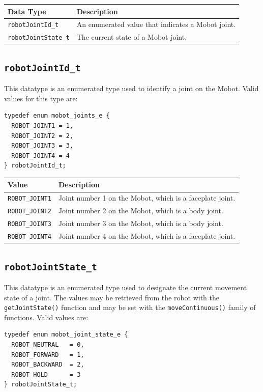 \documentclass{article}
\begin{document}
\begin{tabular}{p{3.5cm}p{10cm}} \hline 
Data Type& Description \\
\hline 
\texttt{robotJointId\_t} & An enumerated value that indicates a Mobot joint. \\
\texttt{robotJointState\_t} & The current state of a Mobot joint. \\
\hline
\end{tabular}

\subsection{\label{sec:robotJointId_t}\texttt{robotJointId\_t}}
This datatype is an enumerated type used to identify a joint on the Mobot. Valid
values for this type are:
\begin{verbatim}
typedef enum mobot_joints_e {
  ROBOT_JOINT1 = 1,
  ROBOT_JOINT2 = 2,
  ROBOT_JOINT3 = 3,
  ROBOT_JOINT4 = 4
} robotJointId_t;
\end{verbatim}

\begin{tabular}{p{3cm}p{10cm}} \hline 
Value & Description \\
\hline 
\texttt{ROBOT\_JOINT1} & Joint number 1 on the Mobot, which is a faceplate joint. \\
\texttt{ROBOT\_JOINT2} & Joint number 2 on the Mobot, which is a body joint. \\
\texttt{ROBOT\_JOINT3} & Joint number 3 on the Mobot, which is a body joint. \\
\texttt{ROBOT\_JOINT4} & Joint number 4 on the Mobot, which is a faceplate joint. \\
\hline
\end{tabular}

\subsection{\label{sec:robotJointState_t}\texttt{robotJointState\_t}}
This datatype is an enumerated type used to designate the current 
movement state of a joint. The values may be retrieved from the 
robot with the \texttt{getJointState()} function and may be set 
with the \texttt{moveContinuous()} family of functions. Valid values are:

\begin{verbatim}
typedef enum mobot_joint_state_e {
  ROBOT_NEUTRAL   = 0,
  ROBOT_FORWARD   = 1,
  ROBOT_BACKWARD  = 2,
  ROBOT_HOLD      = 3
} robotJointState_t;
\end{verbatim}
\end{document}
